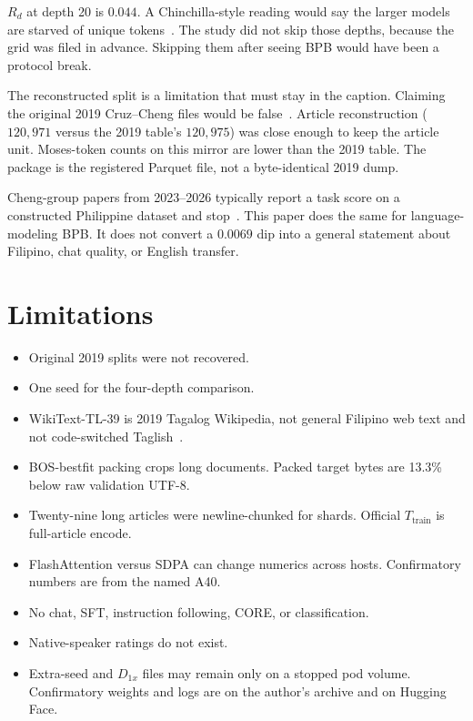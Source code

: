 \documentclass[11pt,a4paper]{article}
\begin{document}
$R_d$ at depth 20 is $0.044$. A Chinchilla-style reading would say the larger models are starved of unique tokens~\cite{hoffmann2022chinchilla}. The study did not skip those depths, because the grid was filed in advance. Skipping them after seeing BPB would have been a protocol break.

The reconstructed split is a limitation that must stay in the caption. Claiming the original 2019 Cruz--Cheng files would be false~\cite{cruz2019eval}. Article reconstruction ($120{,}971$ versus the 2019 table's $120{,}975$) was close enough to keep the article unit. Moses-token counts on this mirror are lower than the 2019 table. The package is the registered Parquet file, not a byte-identical 2019 dump.

Cheng-group papers from 2023--2026 typically report a task score on a constructed Philippine dataset and stop~\cite{espiritu2023balarila,vicente2024vardial,ong2025aigenerated}. This paper does the same for language-modeling BPB. It does not convert a $0.0069$ dip into a general statement about Filipino, chat quality, or English transfer.

\section{Limitations}
\label{sec:limits}

\begin{itemize}
\item Original 2019 splits were not recovered.
\item One seed for the four-depth comparison.
\item WikiText-TL-39 is 2019 Tagalog Wikipedia, not general Filipino web text and not code-switched Taglish~\cite{cruz2019eval}.
\item BOS-bestfit packing crops long documents. Packed target bytes are 13.3\% below raw validation UTF-8.
\item Twenty-nine long articles were newline-chunked for shards. Official $T_{\mathrm{train}}$ is full-article encode.
\item FlashAttention versus SDPA can change numerics across hosts. Confirmatory numbers are from the named A40.
\item No chat, SFT, instruction following, CORE, or classification.
\item Native-speaker ratings do not exist.
\item Extra-seed and $D_{1x}$ files may remain only on a stopped pod volume. Confirmatory weights and logs are on the author's archive and on Hugging Face.
\end{itemize}
\end{document}
